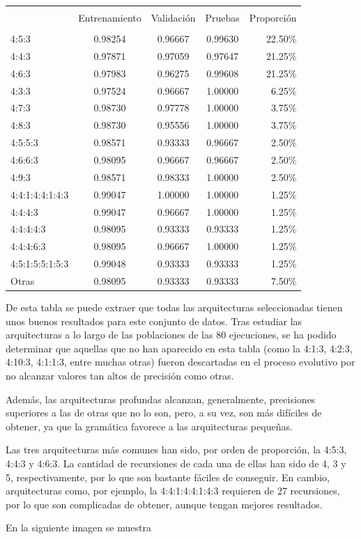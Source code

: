 \documentclass[spanish,a4paper,12pt,twoside]{report}
\begin{document}
\begin{center}
  \begin{tabular}{l c c c r}
    \hline \\ [-2ex]
    & Entrenamiento & Validación & Pruebas & Proporción \\ [0.5ex]
    \hline \\ [-1ex]
    4:5:3 & 0.98254 & 0.96667 & 0.99630 & 22.50\% \\
    4:4:3 & 0.97871 & 0.97059 & 0.97647 & 21.25\% \\
    4:6:3 & 0.97983 & 0.96275 & 0.99608 & 21.25\% \\
    4:3:3 & 0.97524 & 0.96667 & 1.00000 & 6.25\% \\ 
    4:7:3 & 0.98730 & 0.97778 & 1.00000 & 3.75\% \\ 
    4:8:3 & 0.98730 & 0.95556 & 1.00000 & 3.75\% \\
    4:5:5:3 & 0.98571 & 0.93333 & 0.96667 & 2.50\% \\
    4:6:6:3 & 0.98095 & 0.96667 & 0.96667 & 2.50\% \\
    4:9:3 & 0.98571 & 0.98333 & 1.00000 & 2.50\% \\ 
    4:4:1:4:4:1:4:3 & 0.99047 & 1.00000 & 1.00000 & 1.25\% \\
    4:4:4:3 & 0.99047 & 0.96667 & 1.00000 & 1.25\% \\
    4:4:4:4:3 & 0.98095 & 0.93333 & 0.93333 & 1.25\% \\
    4:4:4:6:3 & 0.98095 & 0.96667 & 1.00000 & 1.25\% \\
    4:5:1:5:5:1:5:3 & 0.99048 & 0.93333 & 0.93333 & 1.25\% \\ 
    Otras & 0.98095 & 0.93333 & 0.93333 & 7.50\% \\ [1ex]
    \hline
  \end{tabular}
\end{center} \par
  De esta tabla se puede extraer que todas las arquitecturas seleccionadas tienen unos buenos resultados para este conjunto de datos. Tras estudiar las arquitecturas a lo largo de las poblaciones de las 80 ejecuciones, se ha podido determinar que aquellas que no han aparecido en esta tabla (como la 4:1:3, 4:2:3, 4:10:3, 4:1:1:3, entre muchas otras) fueron descartadas en el proceso evolutivo por no alcanzar valores tan altos de precisión como otras. \par
  Además, las arquitecturas profundas alcanzan, generalmente, precisiones superiores a las de otras que no lo son, pero, a su vez, son más difíciles de obtener, ya que la gramática favorece a las arquitecturas pequeñas. \par
  Las tres arquitecturas más comunes han sido, por orden de proporción, la 4:5:3, 4:4:3 y 4:6:3. La cantidad de recursiones de cada una de ellas han sido de 4, 3 y 5, respectivamente, por lo que son bastante fáciles de conseguir. En cambio, arquitecturas como, por ejemplo, la 4:4:1:4:4:1:4:3 requieren de 27 recursiones, por lo que son complicadas de obtener, aunque tengan mejores resultados. \par
  En la siguiente imagen se muestra 
  
\end{document}
